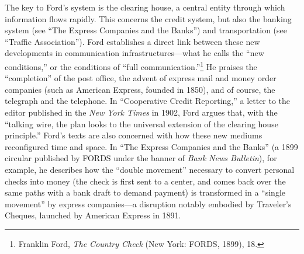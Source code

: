 \documentclass[twoside,symmetric,nobib,justified]{tufte-book}
\begin{document}
The key to Ford's system is the clearing house, a central entity through
which information flows rapidly. This concerns the credit system, but
also the banking system (see ``The Express Companies and the Banks'')
and transportation (see ``Traffic Association''). Ford establishes a
direct link between these new developments in communication
infrastructures---what he calls the ``new conditions,'' or the
conditions of ``full communication.''\footnote{Franklin Ford, \emph{The
  Country Check} (New York: FORDS, 1899), 18.} He praises the
``completion'' of the post office, the advent of express mail and money
order companies (such as American Express, founded in 1850), and of
course, the telegraph and the telephone. In ``Cooperative Credit
Reporting,'' a letter to the editor published in the \emph{New York
Times} in 1902, Ford argues that, with the ``talking wire, the plan
looks to the universal extension of the clearing house principle.''
Ford's texts are also concerned with how these new mediums reconfigured
time and space. In ``The Express Companies and the Banks'' (a 1899
circular published by FORDS under the banner of \emph{Bank News
Bulletin}), for example, he describes how the ``double movement''
necessary to convert personal checks into money (the check is first sent
to a center, and comes back over the same paths with a bank draft to
demand payment) is transformed in a ``single movement'' by express
companies---a disruption notably embodied by Traveler's Cheques,
launched by American Express in 1891.
\end{document}
